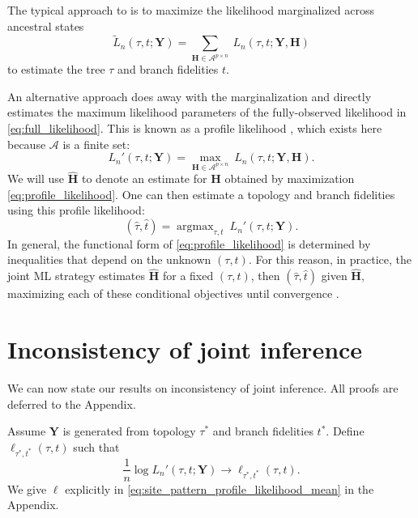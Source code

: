 \documentclass{article}
\newcommand{\alphabet}{\mathcal{A}}
\newcommand{\fullAlignment}{\mathbf{Y}}
\newcommand{\fullAncestralStates}{\mathbf{H}}
\newcommand{\nCols}{n}
\newcommand{\nAncestralStateRows}{p}
\DeclareMathOperator*{\argmax}{argmax}
\begin{document}
The typical approach to is to maximize the likelihood marginalized across ancestral states
\begin{equation}
\label{eq:marginal_likelihood}
\tilde{L}_\nCols(\tau, t; \fullAlignment) = \sum_{\fullAncestralStates\in\alphabet^{\nAncestralStateRows\times\nCols}} \ L_\nCols(\tau, t; \fullAlignment, \fullAncestralStates)
\end{equation}
to estimate the tree $\tau$ and branch fidelities $t$.

An alternative approach \cite{Sagulenko2017-jo} does away with the marginalization and directly estimates the maximum likelihood parameters of the fully-observed likelihood in \eqref{eq:full_likelihood}.
This is known as a profile likelihood \cite{Murphy2000-ry}, which exists here because $\alphabet$ is a finite set:
\begin{equation}
\label{eq:profile_likelihood}
L_\nCols'(\tau, t; \fullAlignment) = \max_{\fullAncestralStates\in\alphabet^{\nAncestralStateRows\times\nCols}} \ L_\nCols(\tau, t; \fullAlignment, \fullAncestralStates).
\end{equation}
We will use $\hat{\fullAncestralStates}$ to denote an estimate for $\fullAncestralStates$ obtained by maximization \eqref{eq:profile_likelihood}.
One can then estimate a topology and branch fidelities using this profile likelihood:
\begin{equation}
\label{eq:profile_likelihood_topology_bl}
(\hat{\tau}, \hat{t}) = \argmax_{\tau, t} \ L_\nCols'(\tau, t; \fullAlignment).
\end{equation}
In general, the functional form of \eqref{eq:profile_likelihood} is determined by inequalities that depend on the unknown $(\tau,t)$.
For this reason, in practice, the joint ML strategy estimates $\hat{\fullAncestralStates}$ for a fixed $(\tau,t)$, then $(\hat{\tau},\hat{t})$ given $\hat{\fullAncestralStates}$, maximizing each of these conditional objectives until convergence \cite{Sagulenko2017-jo}.


\section*{Inconsistency of joint inference}

We can now state our results on inconsistency of joint inference.
All proofs are deferred to the Appendix.

Assume $\fullAlignment$ is generated from topology $\tau^*$ and branch fidelities $t^*$.
Define $\ell_{\tau^*,t^*}(\tau, t)$ such that
$$
\frac{1}{n}\log L_\nCols'(\tau, t; \fullAlignment) \rightarrow \ell_{\tau^*,t^*}(\tau, t).
$$
We give $\ell$ explicitly in \eqref{eq:site_pattern_profile_likelihood_mean} in the Appendix.
\end{document}

